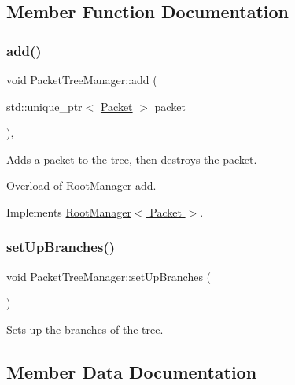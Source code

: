 \subsection{Member Function Documentation}
\mbox{\label{class_packet_tree_manager_a855e71512fe6365c11f312584afff70a}} 
\subsubsection{\texorpdfstring{add()}{add()}}
{\footnotesize\ttfamily void Packet\+Tree\+Manager\+::add (\begin{DoxyParamCaption}\item[{std\+::unique\+\_\+ptr$<$ \hyperlink{class_packet}{Packet} $>$}]{packet }\end{DoxyParamCaption})\hspace{0.3cm}{\ttfamily [final]}, {\ttfamily [virtual]}}



Adds a packet to the tree, then destroys the packet. 

Overload of \hyperlink{class_root_manager}{Root\+Manager} add. 

Implements \hyperlink{class_root_manager_a2f05eb45d5eaee1f9f12e299395652fb}{Root\+Manager$<$ Packet $>$}.

\mbox{\label{class_packet_tree_manager_a3e2aa24c5acd8a87b15cfff2d011f30b}} 
\subsubsection{\texorpdfstring{set\+Up\+Branches()}{setUpBranches()}}
{\footnotesize\ttfamily void Packet\+Tree\+Manager\+::set\+Up\+Branches (\begin{DoxyParamCaption}{ }\end{DoxyParamCaption})\hspace{0.3cm}{\ttfamily [private]}}



Sets up the branches of the tree. 



\subsection{Member Data Documentation}
\mbox{\label{class_packet_tree_manager_a3f7da74c8d3e4f3323c7ffdb8b845c45}} 
